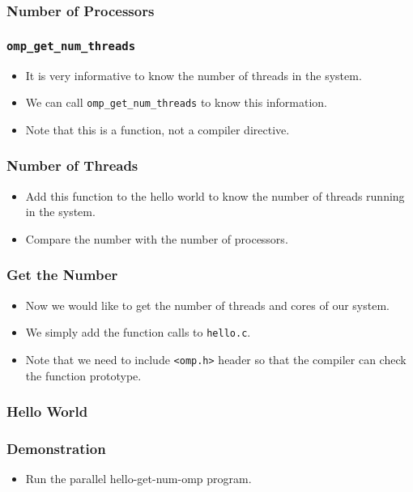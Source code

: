 \documentclass{beamer}
\begin{document}
\begin{frame}
\frametitle{Number of Processors} 
\end{frame}

\begin{frame}
\frametitle{\tt omp\_get\_num\_threads}
\begin{itemize}
\item It is very informative to know the number of threads in the
  system.
\item We can call {\tt omp\_get\_num\_threads} to know this
  information.
\item Note that this is a function, not a compiler directive.
\end{itemize}
\end{frame}

\begin{frame}
\frametitle{Number of Threads}
\begin{itemize}
\item Add this function to the hello world to know the number of
  threads running in the system.
\item Compare the number with the number of processors.
\end{itemize}
\end{frame}


\begin{frame}
\frametitle{Get the Number}
\begin{itemize}
\item Now we would like to get the number of threads and cores of our
  system.
\item We simply add the function calls to {\tt hello.c}.
\item Note that we need to include {\tt <omp.h>} header so that the
  compiler can check the function prototype.
\end{itemize}
\end{frame}


\begin{frame}
\frametitle{Hello World} 
\end{frame}

\begin{frame}
\frametitle{Demonstration}
\begin{itemize}
\item Run the parallel hello-get-num-omp program.
\end{itemize}
\end{frame}
\end{document}
